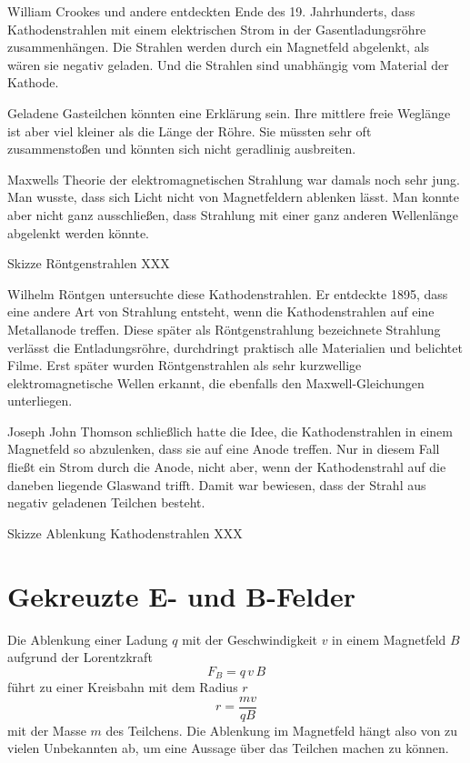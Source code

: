 William Crookes und andere entdeckten Ende des 19. Jahrhunderts, dass Kathodenstrahlen mit einem elektrischen Strom in der Gasentladungsröhre zusammenhängen. Die Strahlen werden durch ein Magnetfeld abgelenkt, als wären sie negativ geladen. Und die Strahlen sind unabhängig vom Material der Kathode.

Geladene Gasteilchen könnten eine Erklärung sein. Ihre mittlere freie Weglänge ist aber viel kleiner als die Länge der Röhre. Sie müssten sehr oft zusammenstoßen und könnten sich nicht geradlinig ausbreiten.

Maxwells Theorie der elektromagnetischen Strahlung war damals noch sehr jung. Man wusste, dass sich Licht nicht von Magnetfeldern ablenken lässt. Man konnte aber nicht ganz ausschließen, dass Strahlung mit einer ganz anderen Wellenlänge abgelenkt werden könnte.


\begin{marginfigure}
    \caption{Skizze Röntgenstrahlen XXX}
\end{marginfigure}

Wilhelm Röntgen untersuchte diese Kathodenstrahlen. Er entdeckte 1895, dass eine andere Art von Strahlung entsteht, wenn die Kathodenstrahlen auf eine Metallanode treffen. Diese später als Röntgenstrahlung bezeichnete Strahlung verlässt die Entladungsröhre, durchdringt praktisch alle Materialien und belichtet Filme. Erst später wurden Röntgenstrahlen als sehr kurzwellige elektromagnetische Wellen erkannt, die ebenfalls den Maxwell-Gleichungen unterliegen.

Joseph John Thomson schließlich hatte die Idee, die Kathodenstrahlen in einem Magnetfeld so abzulenken, dass sie auf eine Anode treffen. Nur in diesem Fall fließt ein Strom durch die Anode, nicht aber, wenn der Kathodenstrahl auf die daneben liegende Glaswand trifft. Damit war bewiesen, dass der Strahl aus negativ geladenen Teilchen besteht.

\begin{marginfigure}
    \caption{Skizze Ablenkung Kathodenstrahlen XXX}
\end{marginfigure}


\section{Gekreuzte E- und B-Felder}

Die Ablenkung einer Ladung $q$ mit der Geschwindigkeit $v$ in einem Magnetfeld $B$ aufgrund der Lorentzkraft
\begin{equation}
    F_B = q \, v \, B
\end{equation}
führt zu einer Kreisbahn mit dem Radius $r$
\begin{equation}
    r = \frac{m v}{q B}
\end{equation}
mit der Masse $m$ des Teilchens. Die Ablenkung im Magnetfeld hängt also von zu vielen Unbekannten ab, um eine Aussage über das Teilchen machen zu können.


